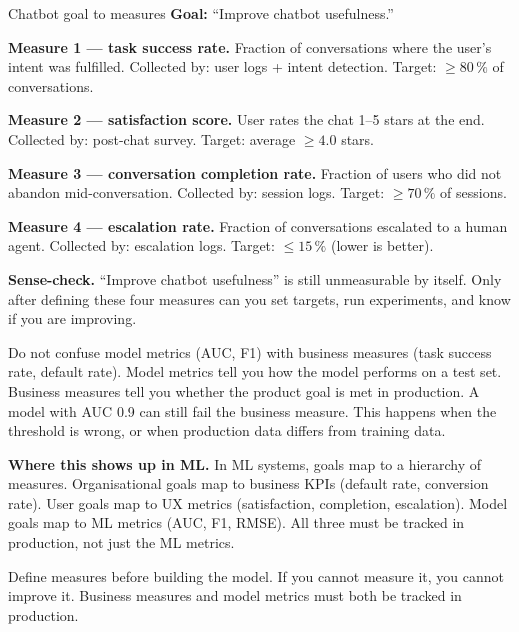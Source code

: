 \documentclass[a4paper,11pt]{article}
\begin{document}
\begin{worked}{Chatbot goal to measures}
\textbf{Goal:} ``Improve chatbot usefulness.''
\begin{steps}
  \item \textbf{Measure 1 --- task success rate.}
        Fraction of conversations where the user's intent was fulfilled.
        Collected by: user logs + intent detection.
        Target: $\geq 80\,\%$ of conversations.
  \item \textbf{Measure 2 --- satisfaction score.}
        User rates the chat 1--5 stars at the end.
        Collected by: post-chat survey.
        Target: average $\geq 4.0$ stars.
  \item \textbf{Measure 3 --- conversation completion rate.}
        Fraction of users who did not abandon mid-conversation.
        Collected by: session logs.
        Target: $\geq 70\,\%$ of sessions.
  \item \textbf{Measure 4 --- escalation rate.}
        Fraction of conversations escalated to a human agent.
        Collected by: escalation logs.
        Target: $\leq 15\,\%$ (lower is better).
  \item \textbf{Sense-check.}
        ``Improve chatbot usefulness'' is still unmeasurable by itself.
        Only after defining these four measures can you set targets,
        run experiments, and know if you are improving.
\end{steps}
\end{worked}

\begin{watchout}
Do not confuse model metrics (AUC, F1) with business measures (task success rate,
default rate).
Model metrics tell you how the model performs on a test set.
Business measures tell you whether the product goal is met in production.
A model with AUC 0.9 can still fail the business measure.
This happens when the threshold is wrong, or when production data differs from training data.
\end{watchout}

\noindent\textbf{Where this shows up in ML.}
In ML systems, goals map to a hierarchy of measures.
Organisational goals map to business KPIs (default rate, conversion rate).
User goals map to UX metrics (satisfaction, completion, escalation).
Model goals map to ML metrics (AUC, F1, RMSE).
All three must be tracked in production, not just the ML metrics.

\begin{keytake}
Define measures before building the model.
If you cannot measure it, you cannot improve it.
Business measures and model metrics must both be tracked in production.
\end{keytake}
\end{document}
